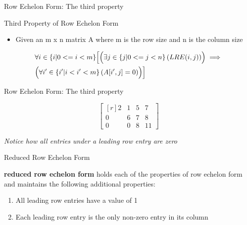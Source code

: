 \documentclass{beamer}
\begin{document}
\begin{frame}{Row Echelon Form: The third property}
  \begin{block}{Third Property of Row Echelon Form}
    \begin{itemize}
    \item Given an m x n matrix A where m is the row size and n is the column size
    \end{itemize}
    \begin{equation}
      \begin{split}
        &\forall i \in \{i | 0 <= i < m \} \Bigl[ \Bigl( \exists j \in \{ j | 0 <= j < n \} \left(LRE(i, j)\right)\Bigr) \implies \Bigr. \\
        &\Bigl. \Bigl( \forall i^{\prime} \in \{ i^{\prime} | i < i^{\prime} < m \} \left( A[i^{\prime}, j] = 0 \right) \Bigr) \Bigr]
      \end{split}
    \end{equation}
  \end{block}
\end{frame}

\begin{frame}{Row Echelon Form: The third property}
  \begin{example}
    \begin{equation}
      \begin{bmatrix*}[r]
        2 & 1 & 5 & 7 \\
        0 & 6 & 7 & 8 \\
        0 & 0 & 8 & 11
      \end{bmatrix*}
    \end{equation}

    \textit{Notice how all entries under a leading row entry are zero}
  \end{example}
\end{frame}

\begin{frame}{Reduced Row Echelon Form}
  \begin{definition}
    \textbf{reduced row echelon form} holds each of the properties of row echelon form and maintains
    the following additional properties:
    \begin{enumerate}
      \item All leading row entries have a value of 1
      \item Each leading row entry is the only non-zero entry in its column 
    \end{enumerate}
  \end{definition}
\end{frame}
\end{document}

